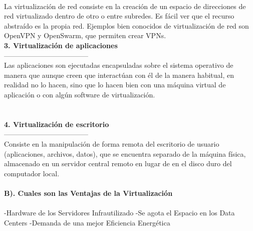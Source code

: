 \documentclass[twoside,twocolumn]{article}
\begin{document}
\begin{flushright}
\begin{itemize}
\textbf{}\\
La virtualización de red consiste en la creación de un
espacio de direcciones de red virtualizado dentro de otro o entre subredes. Es
fácil ver que el recurso abstraído es la propia red. Ejemplos bien conocidos de
virtualización de red son OpenVPN y OpenSwarm, que permiten crear VPNs. 
\textbf{}\\
\textbf{3. Virtualización de aplicaciones }\\
------------------------------------
\textbf{}\\
 Las aplicaciones son ejecutadas encapsuladas sobre el
sistema operativo  de manera que aunque
creen que interactúan con él de la manera habitual, en realidad no
lo hacen, sino que lo hacen bien con una máquina virtual de aplicación o con algún
software de virtualización. 
\textbf{}\\
\textbf{}\\
\textbf{}\\
\textbf{4. Virtualización de escritorio }\\
------------------------------------
\textbf{}\\
 Consiste en la manipulación de forma remota del escritorio
de usuario (aplicaciones, archivos, datos), que se encuentra separado de la máquina
física, almacenado en un servidor central remoto en lugar de en el disco duro del
computador local. 
\textbf{}\\
\textbf{}\\
 \textbf{B). Cuales son las Ventajas de la Virtualización}\\

\textbf{}\\
-Hardware de los Servidores Infrautilizado
-Se agota el Espacio en los Data Centers 
-Demanda de una mejor Eficiencia Energética 

\textbf{}\\
\textbf{}\\
\textbf{}\\












\end{itemize}
\end{flushright}
\end{document}
